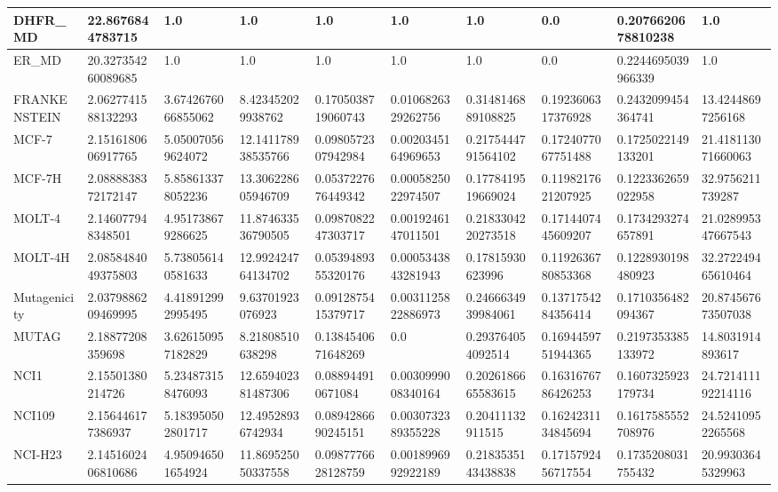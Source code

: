 \documentclass{article}
\begin{document}
\begin{table}[!ht]
\begin{tabular}{|l|l|l|l|l|l|l|l|l|l|}
        DHFR\_MD & 22.8676844783715 & 1.0 & 1.0 & 1.0 & 1.0 & 1.0 & 0.0 & 0.2076620678810238 & 1.0 \\ \hline
        ER\_MD & 20.327354260089685 & 1.0 & 1.0 & 1.0 & 1.0 & 1.0 & 0.0 & 0.2244695039966339 & 1.0 \\ \hline
        FRANKENSTEIN & 2.0627741588132293 & 3.6742676066855062 & 8.423452029938762 & 0.1705038719060743 & 0.0106826329262756 & 0.3148146889108825 & 0.1923606317376928 & 0.2432099454364741 & 13.42448697256168 \\ \hline
        MCF-7 & 2.1516180606917765 & 5.050070569624072 & 12.141178938535766 & 0.0980572307942984 & 0.0020345164969653 & 0.2175444791564102 & 0.1724077067751488 & 0.1725022149133201 & 21.418113071660063 \\ \hline
        MCF-7H & 2.0888838372172147 & 5.858613378052236 & 13.306228605946709 & 0.0537227676449342 & 0.0005825022974507 & 0.1778419519669024 & 0.1198217621207925 & 0.1223362659022958 & 32.9756211739287 \\ \hline
        MOLT-4 & 2.146077948348501 & 4.951738679286625 & 11.874633536790505 & 0.0987082247303717 & 0.0019246147011501 & 0.2183304220273518 & 0.1714407445609207 & 0.1734293274657891 & 21.028995347667543 \\ \hline
        MOLT-4H & 2.0858484049375803 & 5.738056140581633 & 12.992424764134702 & 0.0539489355320176 & 0.0005343843281943 & 0.17815930623996 & 0.1192636780853368 & 0.1228930198480923 & 32.272249465610464 \\ \hline
        Mutagenicity & 2.0379886209469995 & 4.418912992995495 & 9.63701923076923 & 0.0912875415379717 & 0.0031125822886973 & 0.2466634939984061 & 0.1371754284356414 & 0.1710356482094367 & 20.874567673507038 \\ \hline
        MUTAG & 2.18877208359698 & 3.626150957182829 & 8.21808510638298 & 0.1384540671648269 & 0.0 & 0.293764054092514 & 0.1694459751944365 & 0.2197353385133972 & 14.8031914893617 \\ \hline
        NCI1 & 2.15501380214726 & 5.234873158476093 & 12.659402381487306 & 0.088944910671084 & 0.0030999008340164 & 0.2026186665583615 & 0.1631676786426253 & 0.1607325923179734 & 24.721411192214116 \\ \hline
        NCI109 & 2.156446177386937 & 5.183950502801717 & 12.49528936742934 & 0.0894286690245151 & 0.0030732389355228 & 0.20411132911515 & 0.1624231134845694 & 0.1617585552708976 & 24.52410952265568 \\ \hline
        NCI-H23 & 2.1451602406810686 & 4.950946501654924 & 11.869525050337558 & 0.0987776628128759 & 0.0018996992922189 & 0.2183535143438838 & 0.1715792456717554 & 0.1735208031755432 & 20.99303645329963 \\ \hline

\end{tabular}
\end{table}
\end{document}
